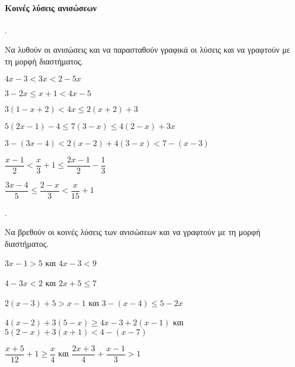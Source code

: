 \documentclass[11pt,a4paper,twocolumn]{article}
\newcounter{askhsh}
\newcommand{\askhsh}{\large\theaskhsh.\ \addtocounter{askhsh}{1}}
\begin{document}
\paragraph{Κοινές λύσεις ανισώσεων}
\askhsh Να λυθούν οι ανισώσεις και να παρασταθούν γραφικά οι λύσεις και να γραφτούν με τη μορφή διαστήματος.
\begin{alist}
\item $ 4x-3<3x<2-5x $
\item $ 3-2x\leq x+1<4x-5 $
\item $ 3(1-x+2)<4x\leq2(x+2)+3 $
\item $ 5(2x-1)-4\leq 7(3-x)\leq 4(2-x)+3x $
\item $ 3-(3x-4)<2(x-2)+4(3-x)<7-(x-3) $
\item $ \dfrac{x-1}{2}<\dfrac{x}{3}+1\leq\dfrac{2x-1}{2}-\dfrac{1}{3} $
\item $ \dfrac{3x-4}{5}\leq\dfrac{2-x}{3}<\dfrac{x}{15}+1 $
\end{alist}
\askhsh Να βρεθούν οι κοινές λύσεις των ανισώσεων και να γραφτούν με τη μορφή διαστήματος.
\begin{alist}
\item $ 3x-1>5 $ και $ 4x-3<9 $
\item $ 4-3x<2 $ και $ 2x+5\leq7 $
\item $ 2(x-3)+5>x-1 $ και $ 3-(x-4)\leq5-2x $
\item $ 4(x-2)+3(5-x)\geq4x-3+2(x-1) $ και $ 5(2-x)+3(x+1)<4-(x-7) $
\item $ \dfrac{x+5}{12}+1\geq\dfrac{x}{4} $ και $ \dfrac{2x+3}{4}+\dfrac{x-1}{3}>1 $
\end{alist}
\end{document}
